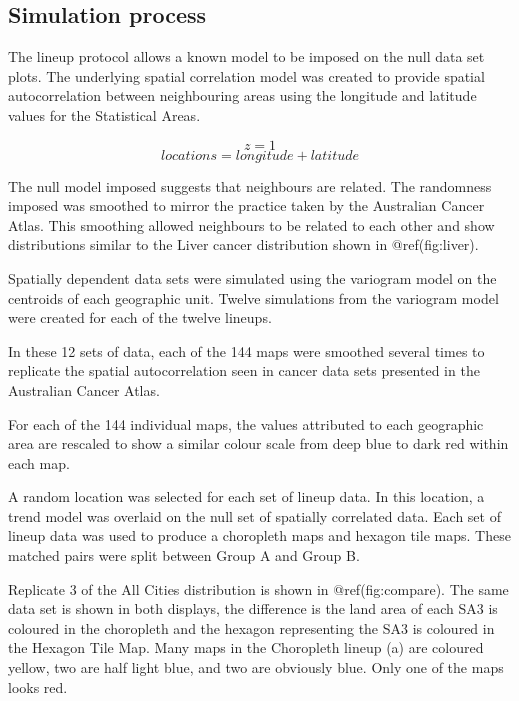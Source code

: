 \documentclass[conference,final,]{IEEEtran}
\begin{document}
\hypertarget{simulation-process}{%
\subsection{Simulation process}\label{simulation-process}}

The lineup protocol allows a known model to be imposed on the null data
set plots. The underlying spatial correlation model was created to
provide spatial autocorrelation between neighbouring areas using the
longitude and latitude values for the Statistical Areas.

\[z = 1\] \[locations = longitude + latitude\]

The null model imposed suggests that neighbours are related. The
randomness imposed was smoothed to mirror the practice taken by the
Australian Cancer Atlas. This smoothing allowed neighbours to be related
to each other and show distributions similar to the Liver cancer
distribution shown in @ref(fig:liver).

Spatially dependent data sets were simulated using the variogram model
on the centroids of each geographic unit. Twelve simulations from the
variogram model were created for each of the twelve lineups.

In these 12 sets of data, each of the 144 maps were smoothed several
times to replicate the spatial autocorrelation seen in cancer data sets
presented in the Australian Cancer Atlas.

For each of the 144 individual maps, the values attributed to each
geographic area are rescaled to show a similar colour scale from deep
blue to dark red within each map.

A random location was selected for each set of lineup data. In this
location, a trend model was overlaid on the null set of spatially
correlated data. Each set of lineup data was used to produce a
choropleth maps and hexagon tile maps. These matched pairs were split
between Group A and Group B.

Replicate 3 of the All Cities distribution is shown in
@ref(fig:compare). The same data set is shown in both displays, the
difference is the land area of each SA3 is coloured in the choropleth
and the hexagon representing the SA3 is coloured in the Hexagon Tile
Map. Many maps in the Choropleth lineup (a) are coloured yellow, two are
half light blue, and two are obviously blue. Only one of the maps looks
red.
\end{document}
